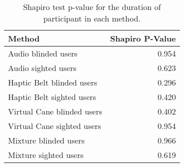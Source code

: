 
\begin{table}[!htb]
\centering
\caption{Shapiro test p-value for the duration of participant in each method.}
\label{tab:shapiro_duration}
\begin{tabular}{lr}
\toprule
                    Method &  Shapiro P-Value \\
\midrule
       Audio blinded users &            0.954 \\
       Audio sighted users &            0.623 \\
 Haptic Belt blinded users &            0.296 \\
 Haptic Belt sighted users &            0.420 \\
Virtual Cane blinded users &            0.402 \\
Virtual Cane sighted users &            0.954 \\
     Mixture blinded users &            0.966 \\
     Mixture sighted users &            0.619 \\
\bottomrule
\end{tabular}
\end{table}

